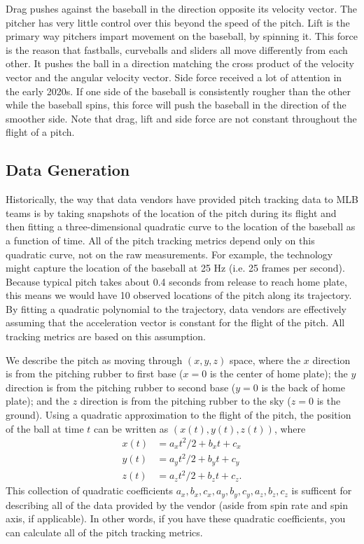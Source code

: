 \documentclass{article}
\begin{document}
    Drag pushes against the baseball in the direction opposite its velocity vector. The pitcher has very little control over this beyond the speed of the pitch. Lift is the primary way pitchers impart movement on the baseball, by spinning it. This force is the reason that fastballs, curveballs and sliders all move differently from each other. It pushes the ball in a direction matching the cross product of the velocity vector and the angular velocity vector. Side force received a lot of attention in the early 2020s. If one side of the baseball is consistently rougher than the other while the baseball spins, this force will push the baseball in the direction of the smoother side. Note that drag, lift and side force are not constant throughout the flight of a pitch.
 
  \subsection{\sc Data Generation}

    Historically, the way that data vendors have provided pitch tracking data to MLB teams is by taking snapshots of the location of the pitch during its flight and then fitting a three-dimensional quadratic curve to the location of the baseball as a function of time. All of the pitch tracking metrics depend only on this quadratic curve, not on the raw measurements. For example, the technology might capture the location of the baseball at 25 Hz (i.e. 25 frames per second). Because typical pitch takes about 0.4 seconds from release to reach home plate, this means we would have 10 observed locations of the pitch along its trajectory. By fitting a quadratic polynomial to the trajectory, data vendors are effectively assuming that the acceleration vector is constant for the flight of the pitch. All tracking metrics are based on this assumption.

    We describe the pitch as moving through $(x, y, z)$ space, where the $x$ direction is from the pitching rubber to first base ($x = 0$ is the center of home plate); the $y$ direction is from the pitching rubber to second base ($y = 0$ is the back of home plate); and the $z$ direction is from the pitching rubber to the sky ($z = 0$ is the ground). Using a quadratic approximation to the flight of the pitch, the position of the ball at time $t$ can be written as $(x(t), y(t), z(t))$, where
    \begin{align*}
      x(t) &= a_x t^2 / 2 + b_x t + c_x\\
      y(t) &= a_y t^2 / 2 + b_y t + c_y\\
      z(t) &= a_z t^2 / 2 + b_z t + c_z.
    \end{align*}
    This collection of quadratic coefficients $a_x, b_x, c_x, a_y, b_y, c_y, a_z, b_z, c_z$ is sufficent for describing all of the data provided by the vendor (aside from spin rate and spin axis, if applicable). In other words, if you have these quadratic coefficients, you can calculate all of the pitch tracking metrics.
  
\end{document}
